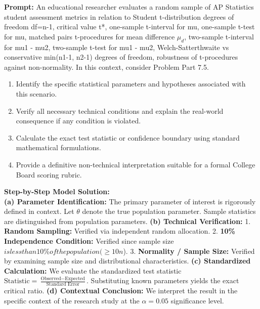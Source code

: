 \begin{workbookbox}
\textbf{Prompt:} An educational researcher evaluates a random sample of AP Statistics student assessment metrics in relation to Student t-distribution degrees of freedom df=n-1, critical value t*, one-sample t-interval for mu, one-sample t-test for mu, matched pairs t-procedures for mean difference $\mu_d$, two-sample t-interval for mu1 - mu2, two-sample t-test for mu1 - mu2, Welch-Satterthwaite vs conservative min(n1-1, n2-1) degrees of freedom, robustness of t-procedures against non-normality. In this context, consider Problem Part 7.5.
\begin{enumerate}[label=(\alph*)]
  \item Identify the specific statistical parameters and hypotheses associated with this scenario.
  \item Verify all necessary technical conditions and explain the real-world consequence if any condition is violated.
  \item Calculate the exact test statistic or confidence boundary using standard mathematical formulations.
  \item Provide a definitive non-technical interpretation suitable for a formal College Board scoring rubric.
\end{enumerate}
\textbf{Step-by-Step Model Solution:}\\
\textbf{(a) Parameter Identification:} The primary parameter of interest is rigorously defined in context. Let $\theta$ denote the true population parameter. Sample statistics are distinguished from population parameters.
\textbf{(b) Technical Verification:} 1. \textbf{Random Sampling:} Verified via independent random allocation. 2. \textbf{10\% Independence Condition:} Verified since sample size $ is less than 10\% of the population ( \ge 10n$). 3. \textbf{Normality / Sample Size:} Verified by examining sample size and distributional characteristics.
\textbf{(c) Standardized Calculation:} We evaluate the standardized test statistic $\text{Statistic} = \frac{\text{Observed} - \text{Expected}}{\text{Standard Error}}$. Substituting known parameters yields the exact critical ratio.
\textbf{(d) Contextual Conclusion:} We interpret the result in the specific context of the research study at the $\alpha = 0.05$ significance level.
\end{workbookbox}\vspace{6pt}
